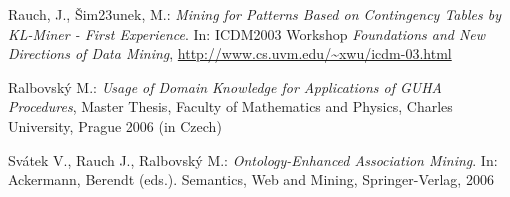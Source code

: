 \documentclass{llncs}
\begin{document}
\begin{thebibliography}{20}
Rauch, J., \v{S}im\accent23unek, M.: \emph{Mining for Patterns Based on 
Contingency Tables by KL-Miner - First Experience}. In: ICDM2003 Workshop
\emph{Foundations and New Directions of Data Mining}, \url{http://www.cs.uvm.edu/~xwu/icdm-03.html}

Ralbovsk\'{y} M.: \emph{Usage of Domain Knowledge for Applications of GUHA
Procedures}, Master Thesis, Faculty of Mathematics and Physics, Charles University,
Prague 2006 (in Czech)

Sv\'{a}tek V., Rauch J., Ralbovsk\'{y} M.: \emph{Ontology-Enhanced Association
Mining}. In: Ackermann, Berendt (eds.). Semantics, Web and Mining, 
Springer-Verlag, 2006

\end{thebibliography}
\end{document}
